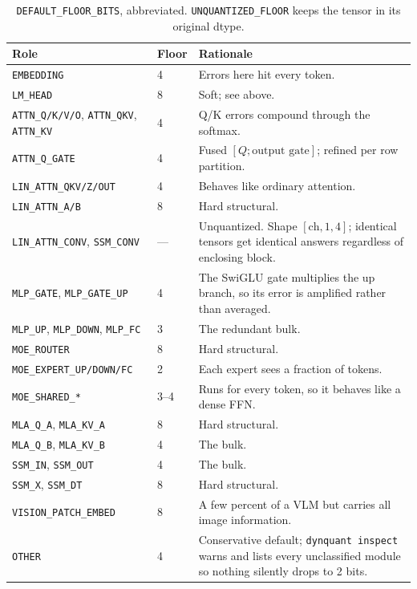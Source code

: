 \documentclass[11pt]{article}
\newcommand{\code}[1]{\texttt{#1}}
\begin{document}
\begin{table}[H]
\centering\small
\caption{\code{DEFAULT\_FLOOR\_BITS}, abbreviated. \code{UNQUANTIZED\_FLOOR} keeps the tensor in
its original dtype.}
\begin{tabular}{llp{}}
\toprule
Role & Floor & Rationale \\
\midrule
\code{EMBEDDING} & 4 & Errors here hit every token. \\
\rowcolor{rowtint}
\code{LM\_HEAD} & 8 & Soft; see above. \\
\code{ATTN\_Q/K/V/O}, \code{ATTN\_QKV}, \code{ATTN\_KV} & 4 & Q/K errors compound through the
softmax. \\
\rowcolor{rowtint}
\code{ATTN\_Q\_GATE} & 4 & Fused $[Q; \text{output gate}]$; refined per row partition. \\
\code{LIN\_ATTN\_QKV/Z/OUT} & 4 & Behaves like ordinary attention. \\
\rowcolor{rowtint}
\code{LIN\_ATTN\_A/B} & 8 & Hard structural. \\
\code{LIN\_ATTN\_CONV}, \code{SSM\_CONV} & --- & Unquantized. Shape $[\text{ch},1,4]$; identical
tensors get identical answers regardless of enclosing block. \\
\rowcolor{rowtint}
\code{MLP\_GATE}, \code{MLP\_GATE\_UP} & 4 & The SwiGLU gate multiplies the up branch, so its
error is amplified rather than averaged. \\
\code{MLP\_UP}, \code{MLP\_DOWN}, \code{MLP\_FC} & 3 & The redundant bulk. \\
\rowcolor{rowtint}
\code{MOE\_ROUTER} & 8 & Hard structural. \\
\code{MOE\_EXPERT\_UP/DOWN/FC} & 2 & Each expert sees a fraction of tokens. \\
\rowcolor{rowtint}
\code{MOE\_SHARED\_*} & 3--4 & Runs for every token, so it behaves like a dense FFN. \\
\code{MLA\_Q\_A}, \code{MLA\_KV\_A} & 8 & Hard structural. \\
\rowcolor{rowtint}
\code{MLA\_Q\_B}, \code{MLA\_KV\_B} & 4 & The bulk. \\
\code{SSM\_IN}, \code{SSM\_OUT} & 4 & The bulk. \\
\rowcolor{rowtint}
\code{SSM\_X}, \code{SSM\_DT} & 8 & Hard structural. \\
\code{VISION\_PATCH\_EMBED} & 8 & A few percent of a VLM but carries all image information. \\
\rowcolor{rowtint}
\code{OTHER} & 4 & Conservative default; \code{dynquant inspect} warns and lists every
unclassified module so nothing silently drops to 2 bits. \\
\bottomrule
\end{tabular}
\end{table}
\end{document}
